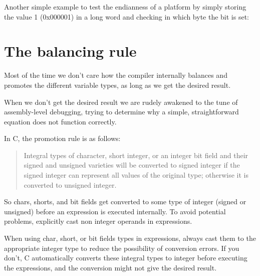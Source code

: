 \documentclass{report}
\begin{document}
Another simple example to test the endianness of a platform by simply storing the value 1 (0x000001) in a long word and checking in which byte the bit is set:




\section{The balancing rule}
Most of the time we don't care how the compiler internally balances and promotes the different variable types, as long as we get the desired result.

When we don't get the desired result we are rudely awakened to the tune of assembly-level debugging, trying to determine why a simple, straightforward equation does not function correctly.

In C, the promotion rule is as follows:
\begin{quote}
Integral types of character, short integer, or an integer bit field and their signed and unsigned varieties will be converted to signed integer if the signed integer can represent all values of the original type; otherwise it is converted to unsigned integer.
\end{quote}
So chars, shorts, and bit fields get converted to some type of integer (signed or unsigned) before an expression is executed internally. 
To avoid potential problems, explicitly cast non integer operands in expressions.

When using char, short, or bit fields types in expressions, always cast them to the appropriate integer type to reduce the possibility of conversion errors. If you don't, C automatically converts these integral types to integer before executing the expressions, and the conversion might not give the desired result.
\end{document}
